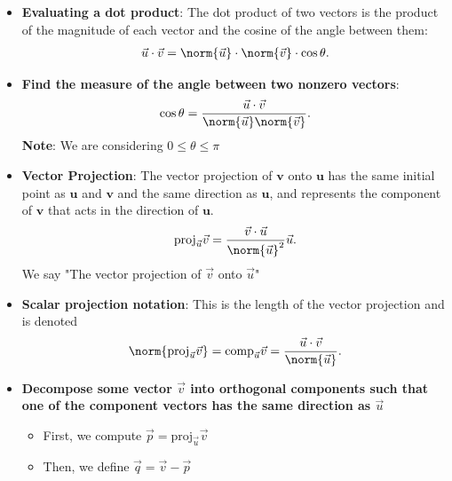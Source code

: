 \documentclass{report}
\begin{document}
\begin{itemize}
\begin{enumerate}
                \end{enumerate}
            \item \textbf{Evaluating a dot product}: 
                The dot product of two vectors is the product of the magnitude of each vector and the cosine of the angle between them:
                \begin{align*}
                    \vec{u} \cdot \vec{v} = \norm{\vec{u}} \cdot \norm{\vec{v}} \cdot \cos{\theta }
                .\end{align*}
            \item \textbf{Find the measure of the angle between two nonzero vectors}:
                \begin{align*}
                    \cos{\theta } = \frac{\vec{u} \cdot \vec{v}}{\norm{\vec{u}}\norm{\vec{v}}}
                .\end{align*}
                \bigbreak \noindent 
                \textbf{Note}: We are considering $0 \leq \theta  \leq \pi $
            \item \textbf{Vector Projection}: The vector projection of $\mathbf{v}$ onto $\mathbf{u}$ has the same initial point as $\mathbf{u}$ and $\mathbf{v}$ and the same direction as $\mathbf{u}$, and represents the component of $\mathbf{v}$ that acts in the direction of $\mathbf{u}$.
                \begin{align*}
                    \text{proj}_{\vec{u}}\vec{v} = \frac{\vec{v} \cdot \vec{u}}{\norm{\vec{u}}^{2}}\vec{u}
                .\end{align*}
                We say "The vector projection of $\vec{v}$ onto $\vec{u}$"
            \item \textbf{Scalar projection notation}: This is the length of the vector projection and is denoted
                \begin{align*}
                    \norm{\text{proj}_{\vec{u}}\vec{v}} = \text{comp}_{\vec{u}}\vec{v} = \frac{\vec{u} \cdot \vec{v}}{\norm{\vec{u}}}
                .\end{align*}
                \pagebreak 
            \item \textbf{Decompose some vector $\vec{v}$ into orthogonal components such that one of the component vectors has the same direction as  $\vec{u}$}
                \begin{itemize}
                    \item First, we compute $\vec{p} = \text{proj}_{\vec{u}}\vec{v} $
                    \item Then, we define $\vec{q}  = \vec{v} - \vec{p}$ 

\end{itemize}
\end{itemize}
\end{document}
